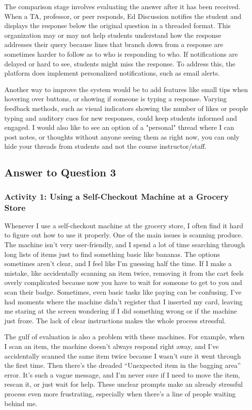 \documentclass[
	letterpaper, %
]{jdf}
\begin{document}
The comparison stage involves evaluating the answer after it has been received. When a TA, professor, or peer responds, Ed Discussion notifies the student and displays the response below the original question in a threaded format. This organization may or may not help students understand how the response addresses their query because lines that branch down from a response are sometimes harder to follow as to who is responding to who. If notifications are delayed or hard to see, students might miss the response. To address this, the platform does implement personalized notifications, such as email alerts.

Another way to improve the system would be to add features like small tips when hovering over buttons, or showing if someone is typing a response. Varying feedback methods, such as visual indicators showing the number of likes or people typing and auditory cues for new responses, could keep students informed and engaged. I would also like to see an option of a "personal" thread where I can post notes, or thoughts without anyone seeing them as right now, you can only hide your threads from students and not the course instructor/staff. 
\newpage

\subsection{Answer to Question 3}
\subsubsection {Activity 1: Using a Self-Checkout Machine at a Grocery Store}
Whenever I use a self-checkout machine at the grocery store, I often find it hard to figure out how to use it properly. One of the main issues is scanning produce. The machine isn’t very user-friendly, and I spend a lot of time searching through long lists of items just to find something basic like bananas. The options sometimes aren’t clear, and I feel like I’m guessing half the time. If I make a mistake, like accidentally scanning an item twice, removing it from the cart feels overly complicated because now you have to wait for someone to get to you and scan their badge. 
Sometimes, even basic tasks like paying can be confusing. I’ve had moments where the machine didn’t register that I inserted my card, leaving me staring at the screen wondering if I did something wrong or if the machine just froze. The lack of clear instructions makes the whole process stressful. 

The gulf of evaluation is also a problem with these machines. For example, when I scan an item, the machine doesn’t always respond right away, and I’ve accidentally scanned the same item twice because I wasn’t sure it went through the first time.  Then there’s the dreaded “Unexpected item in the bagging area” error. It’s such a vague message, and I’m never sure if I need to move the item, rescan it, or just wait for help. These unclear prompts make an already stressful process even more frustrating, especially when there’s a line of people waiting behind me. 
\end{document}
